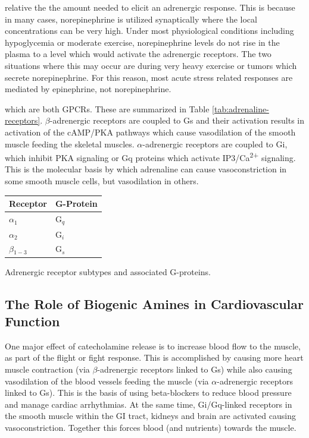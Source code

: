 \documentclass{tufte-handout}
\begin{document}
 relative the the amount needed to elicit an adrenergic response.  This is because in many cases, norepinephrine is utilized synaptically where the local concentrations can be very high.  Under most physiological conditions including hypoglycemia or moderate exercise, norepinephrine levels do not rise in the plasma to a level which would activate the adrenergic receptors.  The two situations where this may occur are during very heavy exercise or tumors which secrete norepinephrine.  For this reason, most acute stress related responses are mediated by epinephrine, not norepinephrine.

 which are both GPCRs.  These are summarized in Table \ref{tab:adrenaline-receptors}.  $\beta$-adrenergic receptors are coupled to Gs and their activation results in activation of the cAMP/PKA pathways which cause vasodilation of the smooth muscle feeding the skeletal muscles.  $\alpha$-adrenergic receptors are coupled to Gi, which inhibit PKA signaling or Gq proteins which activate IP3/Ca\textsuperscript{2+} signaling.  This is the molecular basis by which adrenaline can cause vasoconstriction in some smooth muscle cells, but vasodilation in others.

\begin{margintable}[+1cm]
  \centering
  \begin{tabular}{ll}
    \toprule
    Receptor & G-Protein \\
    \midrule
    $\alpha$$_1$ & G$_q$ \\
    $\alpha$$_2$ & G$_i$ \\
    $\beta$$_{1-3}$ & G$_s$ \\
    \bottomrule
  \end{tabular}
  \caption{Adrenergic receptor subtypes and associated G-proteins.}
  \label{tab:adrenaline-receptors}
\end{margintable}

\subsection{The Role of Biogenic Amines in Cardiovascular Function}

One major effect of catecholamine release is to increase blood flow to the muscle, as part of the flight or fight response.  This is accomplished by causing more heart muscle contraction (via $\beta$-adrenergic receptors linked to Gs) while also causing vasodilation of the blood vessels feeding the muscle (via $\alpha$-adrenergic receptors linked to Gs).  This is the basis of using beta-blockers to reduce blood pressure and manage cardiac arrhythmias. At the same time, Gi/Gq-linked receptors in the smooth muscle within the GI tract, kidneys and brain are activated causing vasoconstriction.  Together this forces blood (and nutrients) towards the muscle.  
\end{document}
